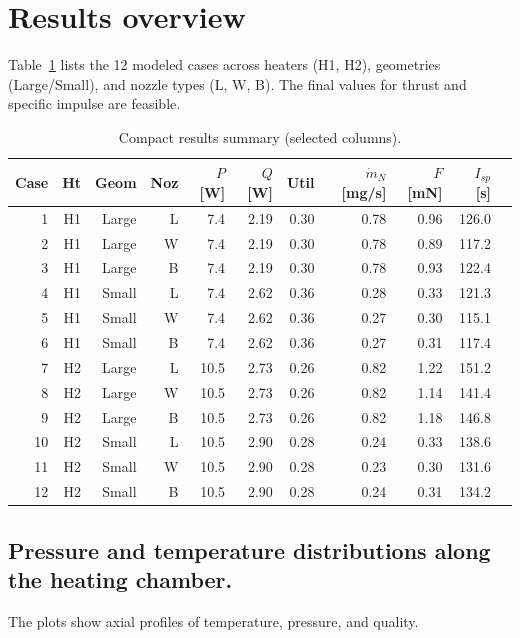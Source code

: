 \documentclass[11pt,a4paper]{article}
\begin{document}
\section{Results overview}
Table~\ref{tab:summary} lists the 12 modeled cases across heaters (H1, H2), geometries (Large/Small), and nozzle types (L, W, B). The final values for thrust and specific impulse are feasible.

\begin{table}[h]
  \centering
  \small
  \caption{Compact results summary (selected columns).}
  \label{tab:summary}
  \begin{tabular}{@{}rrrrrrrrrrr@{}}
    \toprule
    Case & Ht & Geom & Noz & $P$ [W] & $Q$ [W] & Util & $\dot m_N$ [mg/s] & $F$ [mN] & $I_{sp}$ [s] \\
    \midrule
    1 & H1 & Large & L & 7.4 & 2.19 & 0.30 & 0.78 & 0.96 & 126.0 \\
    2 & H1 & Large & W & 7.4 & 2.19 & 0.30 & 0.78 & 0.89 & 117.2 \\
    3 & H1 & Large & B & 7.4 & 2.19 & 0.30 & 0.78 & 0.93 & 122.4 \\
    4 & H1 & Small & L & 7.4 & 2.62 & 0.36 & 0.28 & 0.33 & 121.3 \\
    5 & H1 & Small & W & 7.4 & 2.62 & 0.36 & 0.27 & 0.30 & 115.1 \\
    6 & H1 & Small & B & 7.4 & 2.62 & 0.36 & 0.27 & 0.31 & 117.4 \\
    7 & H2 & Large & L & 10.5 & 2.73 & 0.26 & 0.82 & 1.22 & 151.2 \\
    8 & H2 & Large & W & 10.5 & 2.73 & 0.26 & 0.82 & 1.14 & 141.4 \\
    9 & H2 & Large & B & 10.5 & 2.73 & 0.26 & 0.82 & 1.18 & 146.8 \\
    10 & H2 & Small & L & 10.5 & 2.90 & 0.28 & 0.24 & 0.33 & 138.6 \\
    11 & H2 & Small & W & 10.5 & 2.90 & 0.28 & 0.23 & 0.30 & 131.6 \\
    12 & H2 & Small & B & 10.5 & 2.90 & 0.28 & 0.24 & 0.31 & 134.2 \\
    \bottomrule
  \end{tabular}
\end{table}


\subsection*{Pressure and temperature distributions along the heating chamber.}

The plots show axial profiles of temperature, pressure, and quality.
\end{document}

